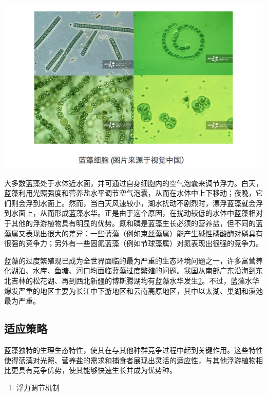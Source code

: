 \documentclass[]{book}
\providecommand{\tightlist}{%
  \setlength{\itemsep}{0pt}\setlength{\parskip}{0pt}}
\begin{document}
\includegraphics[width=8.33in]{images/lanzao1}

大多数蓝藻处于水体近水面，并可通过自身细胞内的空气泡囊来调节浮力。白天，蓝藻利用光照强度和营养盐水平调节空气泡囊，从而在水体中上下移动；夜晚，它们则会浮到水面上。然而，当白天风速较小，湖水扰动不剧烈时，漂浮蓝藻就会浮到水面上，从而形成蓝藻水华。正是由于这个原因，在扰动较低的水体中蓝藻相对于其他的浮游植物具有明显的优势。氮和磷是蓝藻生长必须的营养盐，但不同的蓝藻属又表现出很大的差异：一些蓝藻（例如束丝藻属）能产生碱性磷酸酶对磷具有很强的竞争力；另外有一些固氮蓝藻（例如节球藻属）对氮表现出很强的竞争力。

蓝藻的过度繁殖现已成为全世界面临的最为严重的生态环境问题之一，许多富营养化湖泊、水库、鱼塘、河口均面临蓝藻过度繁殖的问题。我国从南部广东沿海到东北吉林的松花湖、再到西北新疆的博斯腾湖均有蓝藻水华发生\href{Kezhen\%20Qian,\%20Ajay\%20Kumar,\%20et.al.\%20Renew.\%20and\%20Sustain.\%20Energy\%20Reviews,\%202015,\%2042:\%201055-1064.}{2}。不过，蓝藻水华爆发严重的地区主要为长江中下游地区和云南高原地区，其中以太湖、巢湖和滇池最为严重。

\hypertarget{ux9002ux5e94ux7b56ux7565}{%
\subsection{适应策略}\label{ux9002ux5e94ux7b56ux7565}}

蓝藻独特的生理生态特性，使其在与其他种群竞争过程中起到关键作用。这些特性使得蓝藻对光照、营养盐的需求和捕食者展现出灵活的适应性，与其他浮游植物相比更具有竞争优势，使其能够快速生长并成为优势种。

\begin{enumerate}
\def\labelenumi{\arabic{enumi}.}
\tightlist
\item
  浮力调节机制
\end{enumerate}
\end{document}

